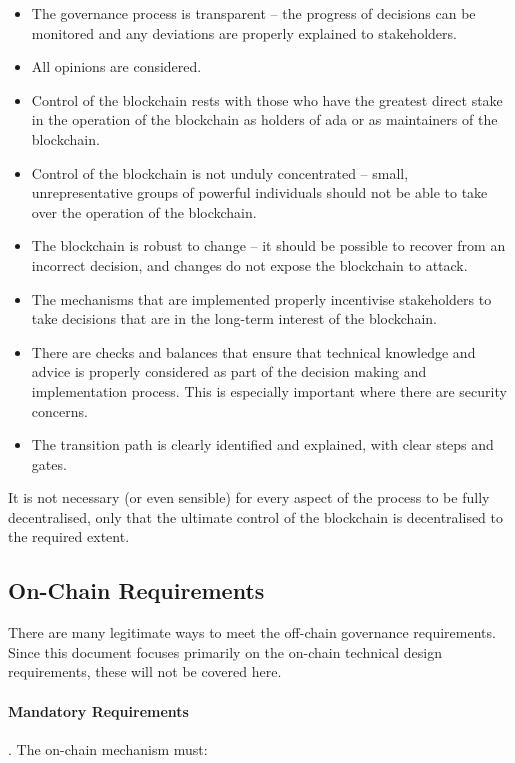 \begin{itemize}
\item
  The governance process is transparent -- the progress of decisions can be monitored and any deviations are properly explained to stakeholders.
\item
  All opinions are considered.
\item
  Control of the blockchain rests with those who have the greatest direct stake in the operation of the blockchain as holders of ada or as maintainers of the blockchain.
\item
  Control of the blockchain is not unduly concentrated -- small, unrepresentative groups of powerful individuals should not be able to take over the operation
  of the blockchain.
\item
  The blockchain is robust to change -- it should be possible to recover from an incorrect decision, and changes do not expose the blockchain to attack.
\item
  The mechanisms that are implemented properly incentivise stakeholders to take decisions that are in the long-term interest of the blockchain.
\item
  There are checks and balances that ensure that technical knowledge and advice is properly considered as part of the decision making and implementation process.
  This is especially important where there are security concerns.
\item
  The transition path is clearly identified and explained, with clear steps and gates.
\end{itemize}


It is not necessary (or even sensible) for every aspect of the process to be fully decentralised, only that the ultimate control of the blockchain is decentralised to the required extent.

\subsection{On-Chain Requirements}

There are many legitimate ways to meet the off-chain governance requirements.  Since this document focuses primarily on the on-chain technical design requirements, these will not be covered here.

\paragraph{Mandatory Requirements}.  The on-chain mechanism must:

